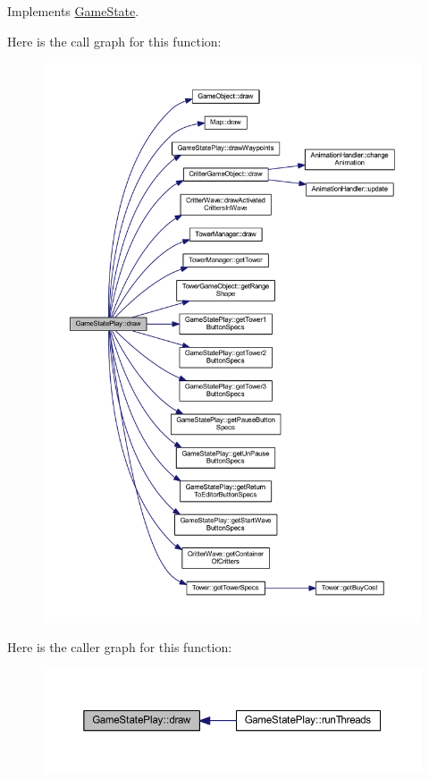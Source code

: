 Implements \hyperlink{class_game_state_a55a6a68aabdf7054ea0e6ddbf24902df}{Game\+State}.



Here is the call graph for this function\+:
\nopagebreak
\begin{figure}[H]
\begin{center}
\leavevmode
\includegraphics[width=350pt]{class_game_state_play_a63a3ba0c891afd8ec126806bab4f315a_cgraph}
\end{center}
\end{figure}




Here is the caller graph for this function\+:
\nopagebreak
\begin{figure}[H]
\begin{center}
\leavevmode
\includegraphics[width=350pt]{class_game_state_play_a63a3ba0c891afd8ec126806bab4f315a_icgraph}
\end{center}
\end{figure}


